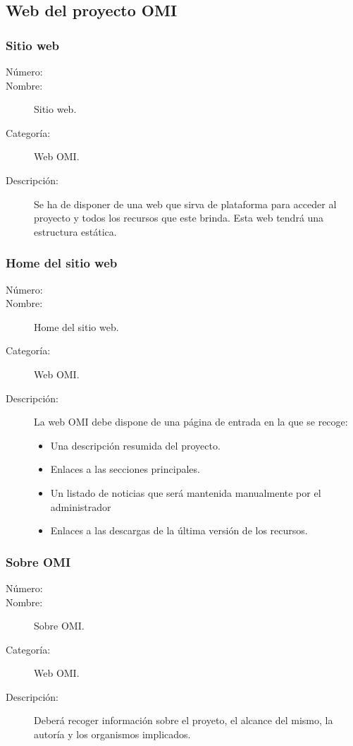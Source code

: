 \subsection{Web del proyecto OMI}

\subsubsection{Sitio web}
\begin{framed}
	\begin{description}
		\item [Número:] \cn
		\item [Nombre:] Sitio web.
		\item [Categoría:] Web OMI.
		\item [Descripción:] Se ha de disponer de una web que sirva de plataforma para acceder al 
      proyecto y todos los recursos que este brinda. Esta web tendrá una estructura estática.
	\end {description}
\end{framed}

\subsubsection{Home del sitio web}
\begin{framed}
	\begin{description}
		\item [Número:] \cn
		\item [Nombre:] Home del sitio web.
		\item [Categoría:] Web OMI.
		\item [Descripción:] La web OMI debe dispone de una página de entrada en la que se
      recoge: 
      \begin{itemize}
      \item Una descripción resumida del proyecto.
      \item Enlaces a las secciones principales.
      \item Un listado de noticias que será mantenida manualmente por el administrador
      \item Enlaces a las descargas de la última versión de los recursos.
      \end{itemize}
	\end {description}
\end{framed}

\subsubsection{Sobre OMI}
\begin{framed}
	\begin{description}
		\item [Número:] \cn
		\item [Nombre:] Sobre OMI.
		\item [Categoría:] Web OMI.
		\item [Descripción:] Deberá recoger información sobre el proyeto, el alcance del mismo, la autoría y los organismos implicados.
	\end {description}
\end{framed}

